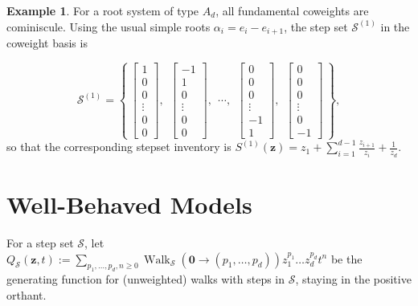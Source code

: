 \documentclass[A4,12pt]{article}
\newcommand{\<}{\left\langle}
\renewcommand{\>}{\right\rangle}
\newcommand{\steps}{\mathcal{S}}
\newcommand{\z}{\mathbf{z}}
\DeclareMathOperator{\Walk}{Walk}
\newcommand{\ds}{\displaystyle}
\theoremstyle{definition}
\theoremstyle{example}
\newtheorem{example}{Example}
\begin{document}
\begin{example}
\label{ex:cominiscule-1}
For a root system of type $A_d$, all fundamental coweights are cominiscule. Using the usual simple roots $\alpha_i=e_i-e_{i+1}$, the step set $\steps^{(1)}$ in the coweight basis is 

$$ \steps^{(1)} = \left\{ ~
\begin{bmatrix} 1\\0\\0\\ \vdots\\0\\0 \end{bmatrix} ,~~ \begin{bmatrix} -1\\1\\0\\ \vdots \\0\\0 \end{bmatrix}
 ,~~ \cdots ,~~
\begin{bmatrix} 0\\0\\0\\ \vdots \\-1\\1 \end{bmatrix} ,~~ \begin{bmatrix} 0\\0\\0\\ \vdots \\0\\-1 \end{bmatrix}
~ \right\}, $$
so that the corresponding stepset inventory is $S^{(1)}(\z) = z_1 + \sum_{i=1}^{d-1} \frac{z_{i+1}}{z_i} + \frac{1}{z_d}$.
\end{example}

\section{Well-Behaved Models}


For a step set $\steps$, let $Q_\steps(\z,t) := \ds\sum_{p_1,\dots, p_d, n\geq 0} \Walk_\steps(\mathbf{0}\to (p_1,\dots, p_d)) z_1^{p_1}\dots z_d^{p_d}t^n$ be the generating function for (unweighted) walks with steps in $\steps$, staying in the positive orthant. 
\end{document}
